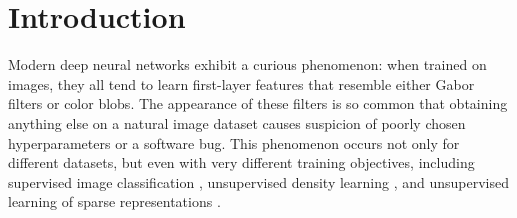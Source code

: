 
\section{Introduction}

Modern deep neural networks exhibit a curious phenomenon: when trained on images, they all tend to learn first-layer features that resemble either Gabor filters or color blobs.
The appearance of these filters is so common that obtaining anything else on a natural image dataset causes suspicion of poorly chosen hyperparameters or a software bug.
This phenomenon occurs not only for different datasets, but even with very different training objectives, including supervised image classification \citep{Krizhevsky-2012}, unsupervised density learning \citep{HonglakL2009}, and unsupervised learning of sparse representations \citep{Le-2011-ICA}.


%
%
%
%
%
%
%
%
%


